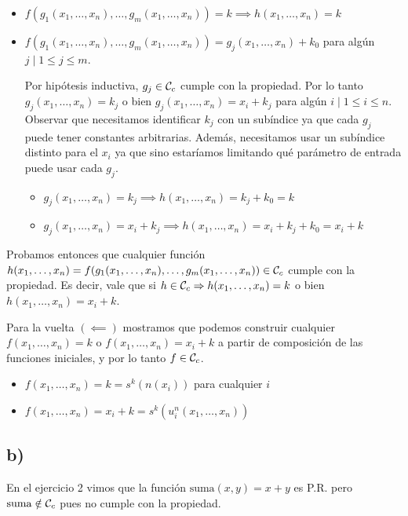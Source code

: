 \begin{itemize}
    \item $f(g_1(x_1, \dots, x_n), \dots, g_m(x_1, \dots, x_n)) = k \implies h(x_1, \dots, x_n) = k$

    \item $f(g_1(x_1, \dots, x_n), \dots, g_m(x_1, \dots, x_n)) = g_j(x_1, \dots, x_n) + k_0$ para algún $j \mid 1 \leq j \leq m$.

    Por hipótesis inductiva, $g_j \in \mathcal{C}_c$ cumple con la propiedad. Por lo tanto $g_j(x_1, \dots, x_n) = k_j$ o bien $g_j(x_1, \dots, x_n) = x_i + k_j$ para algún $i \mid 1 \leq i \leq n$. Observar que necesitamos identificar $k_j$ con un subíndice ya que cada $g_j$ puede tener constantes arbitrarias. Además, necesitamos usar un subíndice distinto para el $x_i$ ya que sino estaríamos limitando qué parámetro de entrada puede usar cada $g_j$.

    \begin{itemize}
        \item $g_j(x_1, \dots, x_n) = k_j \implies h(x_1, \dots, x_n) = k_j + k_0 = k$
        \item $g_j(x_1, \dots, x_n) = x_i + k_j \implies h(x_1, \dots, x_n) = x_i + k_j + k_0 = x_i + k$
    \end{itemize}
\end{itemize}

Probamos entonces que cualquier función $h(x_1, \dots, x_n) = f(g_1(x_1, \dots, x_n), \dots, g_m(x_1, \dots, x_n)) \in \mathcal{C}_c$ cumple con la propiedad. Es decir, vale que si $h \in \mathcal{C}_c \Rightarrow h(x_1, \dots, x_n) = k$ o bien $h(x_1, \dots, x_n) = x_i + k$.

Para la vuelta $(\impliedby)$ mostramos que podemos construir cualquier $f(x_1, \dots, x_n) = k$ o $f(x_1, \dots, x_n) = x_i + k$ a partir de composición de las funciones iniciales, y por lo tanto $f \in \mathcal{C}_c$.

\begin{itemize}
    \item $f(x_1, \dots, x_n) = k = s^k(n(x_i))$ para cualquier $i$
    \item $f(x_1, \dots, x_n) = x_i + k = s^k(u^n_i(x_1, \dots, x_n))$
\end{itemize}

\subsection*{b)}

En el ejercicio 2 vimos que la función $\text{suma}(x, y) = x + y$ es P.R. pero $\text{suma} \notin \mathcal{C}_c$ pues no cumple con la propiedad.
